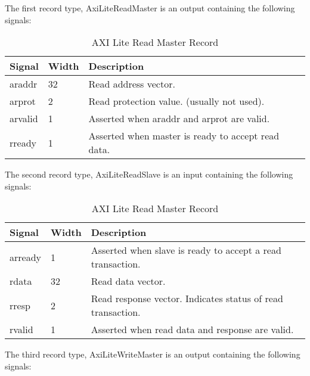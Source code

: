 \documentclass[11pt]{article}
\begin{document}
The first record type, AxiLiteReadMaster is an output containing the following signals:

\begin{table}[H]
\small
\centering
   \begin{tabular}{| l | l | l | }
      \hline \textbf{Signal} & \textbf{Width}  & \textbf{Description} \\
      \hline araddr          & 32              & Read address vector.                         \\
      \hline arprot          & 2               & Read protection value. (usually not used).    \\
      \hline arvalid         & 1               & Asserted when araddr and arprot are valid.   \\
      \hline rready          & 1               & Asserted when master is ready to accept read data. \\
      \hline
   \end{tabular}
   \caption{AXI Lite Read Master Record}
\end{table}

The second record type, AxiLiteReadSlave is an input containing the following signals:

\begin{table}[H]
\small
\centering
   \begin{tabular}{| l | l | l | }
      \hline \textbf{Signal} & \textbf{Width}  & \textbf{Description} \\
      \hline arready         & 1               & Asserted when slave is ready to accept a read transaction. \\
      \hline rdata           & 32              & Read data vector.                         \\
      \hline rresp           & 2               & Read response vector. Indicates status of read transaction. \\
      \hline rvalid          & 1               & Asserted when read data and response are valid. \\
      \hline
   \end{tabular}
   \caption{AXI Lite Read Master Record}
\end{table}

The third record type, AxiLiteWriteMaster is an output containing the following signals:
\end{document}
